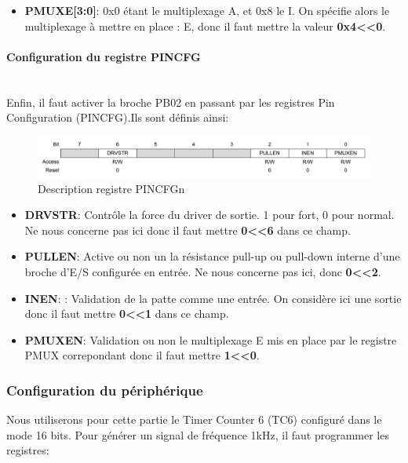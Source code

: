 \documentclass[a4paper]{article}
\begin{document}
	\begin{itemize}
		\item {\bf PMUXE[3:0]}: 0x0 étant le multiplexage A, et 0x8 le I. On spécifie alors le multiplexage à mettre en place : E, donc il faut mettre la valeur {\bf 0x4\textless\textless0}.
	\end{itemize}
	
	\paragraph{Configuration du registre PINCFG} 
	~~\\
	Enfin, il faut activer la broche PB02 en passant par les registres Pin Configuration (PINCFG).Ils sont définis ainsi:   
	\begin{figure}[H]
		\centering
		\includegraphics[width=0.9\linewidth]{PINCFGn.jpg}
		\caption{Description registre PINCFGn}
	\end{figure}
	
	\begin{itemize}
		\item {\bf DRVSTR}: Contrôle la force du driver de sortie. 1 pour fort, 0 pour normal. Ne nous concerne pas ici donc il faut mettre {\bf 0\textless\textless6} dans ce champ.~~\\
		\item {\bf PULLEN}: Active ou non un la résistance pull-up ou pull-down interne d'une broche d'E/S configurée en entrée. Ne nous concerne pas ici, donc {\bf 0\textless\textless2}.~~\\
		\item {\bf INEN}: : Validation de la patte comme une entrée. On considère ici une sortie donc il faut mettre {\bf 0\textless\textless1} dans ce champ.~~\\
		\item {\bf PMUXEN}: Validation ou non le multiplexage E mis en place par le registre PMUX correpondant donc il faut mettre {\bf 1\textless\textless0}.~~\\
	\end{itemize}
	\newpage
	\subsubsection{Configuration du périphérique} 
	Nous utiliserons pour cette partie le Timer Counter 6 (TC6) configuré dans le mode 16 bits. Pour générer un signal de fréquence 1kHz, il faut programmer les registres:
	
\end{document}
